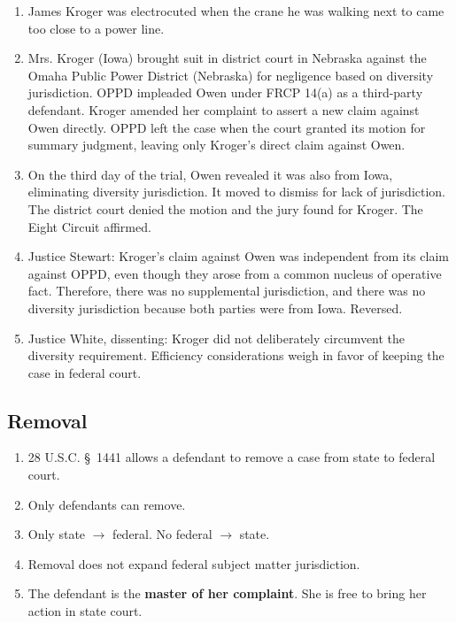 \begin{enumerate}
    \item James Kroger was electrocuted when the crane he was walking next to 
    came too close to a power line.
    \item Mrs. Kroger (Iowa) brought suit in district court in Nebraska 
    against the Omaha Public Power District (Nebraska) for negligence based on 
    diversity jurisdiction. OPPD impleaded Owen under FRCP 14(a) as a 
    third-party defendant. Kroger amended her complaint to assert a new claim 
    against Owen directly. OPPD left the case when the court granted its 
    motion for summary judgment, leaving only Kroger's direct claim against 
    Owen.
    \item On the third day of the trial, Owen revealed it was also from Iowa, 
    eliminating diversity jurisdiction. It moved to dismiss for lack of 
    jurisdiction. The district court denied the motion and the jury found for 
    Kroger. The Eight Circuit affirmed.
    \item Justice Stewart: Kroger's claim against Owen was independent from 
    its claim against OPPD, even though they arose from a common nucleus of 
    operative fact. Therefore, there was no supplemental jurisdiction, and 
    there was no diversity jurisdiction because both parties were from Iowa.  
    Reversed.
    \item Justice White, dissenting: Kroger did not deliberately circumvent 
    the diversity requirement. Efficiency considerations weigh in favor of 
    keeping the case in federal court.  \end{enumerate}

\subsection{Removal}

\begin{enumerate}
    \item 28 U.S.C. \S\ 1441 allows a defendant to remove a case from state to 
    federal court.
    \item Only defendants can remove.
    \item Only state $\rightarrow$ federal. No federal $\rightarrow$ state.
    \item Removal does not expand federal subject matter jurisdiction.
    \item The defendant is the \textbf{master of her complaint}. She is free 
    to bring her action in state court.
\end{enumerate}

